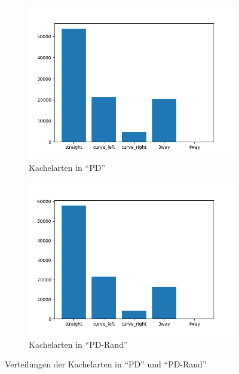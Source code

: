 \begin{figure}[H]
	\centering
	\begin{subfigure}[h]{0.5\textwidth}
		\centering
		\includegraphics[width=\linewidth]{kapitel4/images/plots/tiles-pd.png}
		\caption{Kachelarten in ``PD''}
		\label{pd-drive-tiles}
	\end{subfigure}%
	\begin{subfigure}[h]{0.5\textwidth}
		\centering
		\includegraphics[width=\linewidth]{kapitel4/images/plots/tiles-pd-rand.png}
		\caption{Kachelarten in ``PD-Rand''}
		\label{pd-rand-tiles}
	\end{subfigure}
	\caption{Verteilungen der Kachelarten in ``PD'' und ``PD-Rand''}
	\label{pd-tiles}
\end{figure}

